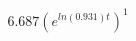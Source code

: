 \documentclass[preview]{standalone}
\begin{document}
\begin{align*}
6.687(e^{ln(0.931)t})^1
\end{align*}
\end{document}

